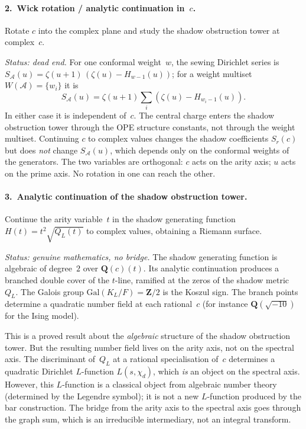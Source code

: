 \documentclass[11pt]{article}
\newcommand{\cA}{\mathcal{A}}
\begin{document}
\paragraph{2.~Wick rotation / analytic continuation in~$c$.}
Rotate $c$ into the complex plane and study the shadow obstruction tower
at complex~$c$.

\emph{Status: dead end.}  For one conformal weight~$w$, the sewing
Dirichlet series is
$S_\cA(u) = \zeta(u{+}1)\,(\zeta(u) - H_{w-1}(u))$; for a weight
multiset $W(\cA)=\{w_i\}$ it is
\[
  S_\cA(u)=\zeta(u{+}1)\sum_i(\zeta(u)-H_{w_i-1}(u)).
\]
In either case it is independent of~$c$.  The central charge enters the shadow obstruction tower
through the OPE structure constants, not through the weight
multiset.  Continuing $c$ to complex values changes the shadow
coefficients $S_r(c)$ but does \emph{not} change $S_\cA(u)$,
which depends only on the conformal weights of the generators.
The two variables are orthogonal: $c$ acts on the arity axis;
$u$ acts on the prime axis.  No rotation in one can reach the
other.

\paragraph{3.~Analytic continuation of the shadow obstruction tower.}
Continue the arity variable~$t$ in the shadow generating
function $H(t) = t^2\sqrt{Q_L(t)}$ to complex values,
obtaining a Riemann surface.

\emph{Status: genuine mathematics, no bridge.}
The shadow generating function is algebraic of degree~$2$
over $\mathbf{Q}(c)(t)$.  Its analytic continuation
produces a branched double cover of the $t$-line, ramified at
the zeros of the shadow metric~$Q_L$.  The Galois group
$\mathrm{Gal}(K_L/F) = \mathbf{Z}/2$ is the Koszul sign.
The branch points determine a quadratic number field at
each rational~$c$ (for instance $\mathbf{Q}(\sqrt{-10})$
for the Ising model).

This is a proved result about the \emph{algebraic} structure
of the shadow obstruction tower.  But the resulting number field lives on
the arity axis, not on the spectral axis.  The discriminant
of~$Q_L$ at a rational specialisation of~$c$ determines a
quadratic Dirichlet $L$-function $L(s, \chi_d)$, which \emph{is}
an object on the spectral axis.  However, this $L$-function is
a classical object from algebraic number theory (determined by
the Legendre symbol); it is not a new $L$-function produced by
the bar construction.  The bridge from the arity axis to the
spectral axis goes through the graph sum, which is an
irreducible intermediary, not an integral transform.
\end{document}
